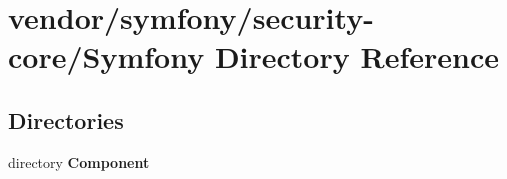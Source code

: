 \section{vendor/symfony/security-\/core/\+Symfony Directory Reference}
\label{dir_f2dd05689a272863128abbc525ae16dd}
\subsection*{Directories}
\begin{DoxyCompactItemize}
\item 
directory {\bf Component}
\end{DoxyCompactItemize}
